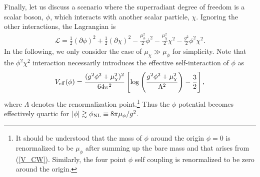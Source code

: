 \documentclass[%
 preprint,
 nofootinbib,
 amsmath,amssymb,
 aps,
 a4paper
]{revtex4-1}
\begin{document}
Finally, let us discuss a scenario where the superradiant degree of freedom is a scalar boson, $\phi$, which interacts with another scalar particle, $\chi$. Ignoring the other interactions, the Lagrangian is 
\begin{align}
\mathcal{L} = \frac{1}{2}(\partial\phi)^2 + \frac{1}{2}(\partial\chi)^2 - \frac{\mu_\phi^2}{2}\phi^2 - \frac{\mu_\chi^2}{2}\chi^2 - \frac{g^2}{2}\phi^2\chi^2.
\end{align}
In the following, we only consider the case of $\mu_\chi\gg \mu_\phi$ for simplicity.
Note that the $\phi^2\chi^2$ interaction necessarily introduces the effective self-interaction of $\phi$ as
\begin{align}
	V_{\rm eff}(\phi) = \frac{(g^2\phi^2+\mu_\chi^2)^2}{64\pi^2} \left[\log \left(\frac{g^2\phi^2+\mu_\chi^2}{\Lambda^2}\right) - \frac{3}{2}\right],
	\label{V_CW}
\end{align}
where $\Lambda$ denotes the renormalization point.\footnote{
	It should be understood that the mass of $\phi$ around the origin $\phi=0$ is renormalized to be $\mu_\phi$ after summing up the bare mass and that arises from (\ref{V_CW}). Similarly, the four point $\phi$ self coupling is renormalized to be zero around the origin.
}
Thus the $\phi$ potential becomes effectively quartic for $|\phi| \gtrsim \phi_{\rm NL}\equiv 8\pi \mu_\phi / g^2$.
\end{document}
